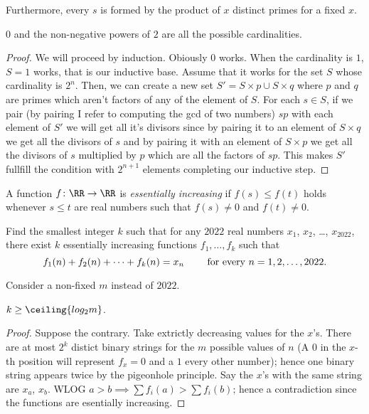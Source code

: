 Furthermore, every $s$ is formed by the product of $x$ distinct 
primes for a fixed $x$.

\begin{claim}
  $0$ and the non-negative powers of $2$ are all the 
  possible cardinalities.
\end{claim}

\begin{proof}
  We will proceed by induction. Obiously $0$ works. 
  When the cardinality is $1$, $S = {1}$ works, that is our 
  inductive base. Assume that it works for the set $S$ whose 
  cardinality is $2^n$. Then, we can create a new set 
  $S' = S\times p \cup S\times q$ where $p$ and $q$ are primes 
  which aren't factors of any of the element of $S$. 
  For each $s \in S$, if we pair (by pairing I refer to 
  computing the gcd of two numbers) $sp$ with each element of 
  $S'$ we will get all it's divisors since by pairing it 
  to an element of $S \times q$ we get all the divisors of $s$ 
  and by pairing it with an element of $S\times p$ we get 
  all the divisors of $s$ multiplied by $p$ which are all the 
  factors of $sp$. This makes $S'$ fullfill the condition with 
  $2^{n+1}$ elements completing our inductive step. 
\end{proof}

\begin{problem}
  A function $f \colon \RR \to \RR$ is
  \emph{essentially increasing}
  if $f(s) \leq f(t)$ holds
  whenever $s\leq t$ are real numbers such that $f(s)\neq 0$ and $f(t)\neq 0$.

  Find the smallest integer $k$ such that
  for any $2022$ real numbers $x_1$, $x_2$, \dots, $x_{2022}$,
  there exist $k$ essentially increasing functions $f_1, \dots, f_k$ such that
  \[ f_1(n) + f_2(n) + \dotsb + f_k(n) = x_n
  \qquad \hbox{ for every } n = 1, 2, \dots, 2022. \]
\end{problem}

Consider a non-fixed $m$ instead of $2022$.

\begin{claim}
  $k \ge \ceiling{log_2 m}$.
\end{claim}

\begin{proof}
  Suppose the contrary. Take extrictly decreasing values for 
  the $x$'s. There are at most $2^{k}$ distict binary strings 
  for the $m$ possible values of $n$ (A $0$ in the $x$-th 
  position will represent $f_x = 0$ and a $1$ every other number); 
  hence one binary string appears twice by the pigeonhole 
  principle. Say the $x$'s with the same string are $x_a$,  $x_b$. 
  WLOG $a > b \implies \sum f_i(a) > \sum f_i(b)$; hence 
  a contradiction since the functions are esentially increasing.
\end{proof}

